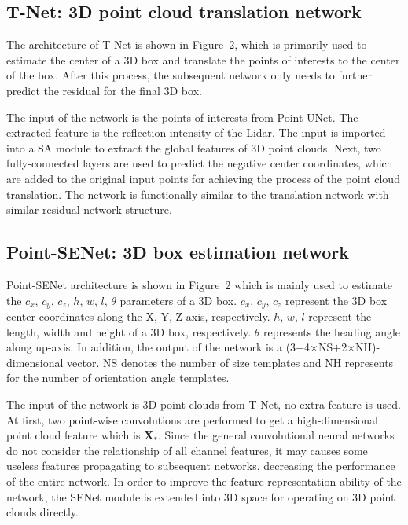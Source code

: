 \documentclass[letterpaper]{article} %
\begin{document}
\subsection{T-Net: 3D point cloud translation network}
The architecture of T-Net is shown in Figure~2, which is primarily used to estimate the center of a 3D box and translate the points of interests to the center of the box. After this process, the subsequent network only needs to further predict the residual for the final 3D box.

The input of the network is the points of interests from Point-UNet. The extracted feature is the reflection intensity of the Lidar. The input is imported into a SA module to extract the global features of 3D point clouds. Next, two fully-connected layers are used to predict the negative center coordinates, which are added to the original input points for achieving the process of the point cloud translation. The network is functionally similar to the translation network with similar residual network structure.

\subsection{Point-SENet: 3D box estimation network}
Point-SENet architecture is shown in Figure~2 which is mainly used to estimate the {$c_x$, $c_y$, $c_z$, $h$, $w$, $l$, $\theta$} parameters of a 3D box. $c_x$, $c_y$, $c_z$ represent the 3D box center coordinates along the X, Y, Z axis, respectively. $h$, $w$, $l$ represent the length, width and height of a 3D box, respectively. $\theta$ represents the heading angle along up-axis. In addition, the output of the network is a (3$+$4$\times$NS$+$2$\times$NH)-dimensional vector. NS denotes the number of size templates and NH represents for the number of orientation angle templates.

The input of the network is 3D point clouds from T-Net, no extra feature is used. At first, two point-wise convolutions are performed to get a high-dimensional point cloud feature which is $\mathbf{X_*}$. Since the general convolutional neural networks do not consider the relationship of all channel features, it may causes some useless features propagating to subsequent networks, decreasing the performance of the entire network. In order to improve the feature representation ability of the network, the SENet module is extended into 3D space for operating on 3D point clouds directly.
\end{document}
